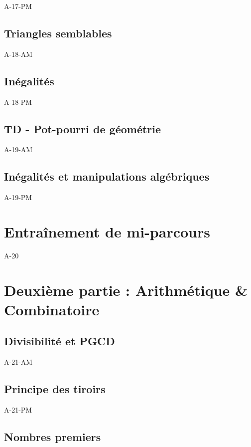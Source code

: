 \documentclass[poly,trombi]{valbonne}
\begin{document}
{A-17-PM}

\subsection{Triangles semblables}

{A-18-AM}

\subsection{Inégalités}

{A-18-PM}

\subsection{TD - Pot-pourri de géométrie}

{A-19-AM}

\subsection{Inégalités et manipulations algébriques}

{A-19-PM}


\section{Entraînement de mi-parcours}

{A-20}


\section{Deuxième partie : Arithmétique \& Combinatoire}

\subsection{Divisibilité et PGCD}

{A-21-AM}

\subsection{Principe des tiroirs}

{A-21-PM}

\subsection{Nombres premiers}
\end{document}
